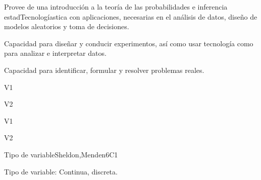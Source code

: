 
\begin{syllabus}


\begin{justification}
Provee de una introducción a la teoría de las probabilidades e inferencia estadTecnologíastica con aplicaciones, necesarias en el análisis de datos, diseño de modelos aleatorios y toma de decisiones.
\end{justification}

\begin{goals}
   \item Capacidad para diseñar y conducir experimentos, así como usar tecnología como para analizar e interpretar datos.
   \item Capacidad para identificar, formular y resolver problemas reales.
\end{goals}

\begin{outcomes}{V1}
   \item {}
   \item {}
\end{outcomes}

\begin{outcomes}{V2}
   \item {}
   \item {}
\end{outcomes}

\begin{competences}{V1}
   \item {}
   \item {}
\end{competences} 

\begin{competences}{V2}
   \item {}
   \item {}
\end{competences}

\begin{unit}{Tipo de variable}{}{Sheldon,Menden}{6}{C1}
   \begin{topics}
      \item Tipo de variable: Continua, discreta.
   \end{topics}


\end{unit}
\end{syllabus}
